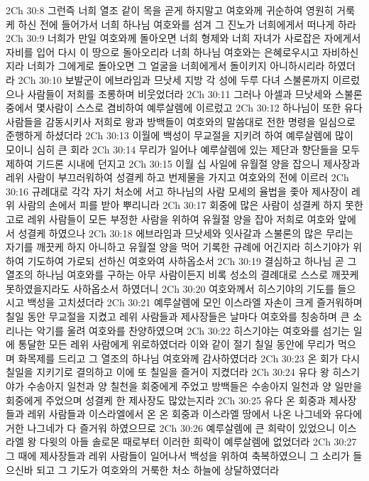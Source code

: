 2Ch 30:8  그런즉 너희 열조 같이 목을 곧게 하지말고 여호와께 귀순하여 영원히 거룩케 하신 전에 들어가서 너희 하나님 여호와를 섬겨 그 진노가 너희에게서 떠나게 하라
2Ch 30:9  너희가 만일 여호와께 돌아오면 너희 형제와 너희 자녀가 사로잡은 자에게서 자비를 입어 다시 이 땅으로 돌아오리라 너희 하나님 여호와는 은혜로우시고 자비하신지라 너희가 그에게로 돌아오면 그 얼굴을 너희에게서 돌이키지 아니하시리라 하였더라
2Ch 30:10  보발군이 에브라임과 므낫세 지방 각 성에 두루 다녀 스불론까지 이르렀으나 사람들이 저희를 조롱하며 비웃었더라
2Ch 30:11  그러나 아셀과 므낫세와 스불론 중에서 몇사람이 스스로 겸비하여 예루살렘에 이르렀고
2Ch 30:12  하나님이 또한 유다 사람들을 감동시키사 저희로 왕과 방백들이 여호와의 말씀대로 전한 명령을 일심으로 준행하게 하셨더라
2Ch 30:13  이월에 백성이 무교절을 지키려 하여 예루살렘에 많이 모이니 심히 큰 회라
2Ch 30:14  무리가 일어나 예루살렘에 있는 제단과 향단들을 모두 제하여 기드론 시내에 던지고
2Ch 30:15  이월 십 사일에 유월절 양을 잡으니 제사장과 레위 사람이 부끄러워하여 성결케 하고 번제물을 가지고 여호와의 전에 이르러
2Ch 30:16  규례대로 각각 자기 처소에 서고 하나님의 사람 모세의 율법을 좇아 제사장이 레위 사람의 손에서 피를 받아 뿌리니라
2Ch 30:17  회중에 많은 사람이 성결케 하지 못한고로 레위 사람들이 모든 부정한 사람을 위하여 유월절 양을 잡아 저희로 여호와 앞에서 성결케 하였으나
2Ch 30:18  에브라임과 므낫세와 잇사갈과 스불론의 많은 무리는 자기를 깨끗케 하지 아니하고 유월절 양을 먹어 기록한 규례에 어긴지라 히스기야가 위하여 기도하여 가로되 선하신 여호와여 사하옵소서
2Ch 30:19  결심하고 하나님 곧 그 열조의 하나님 여호와를 구하는 아무 사람이든지 비록 성소의 결례대로 스스로 깨끗케 못하였을지라도 사하옵소서 하였더니
2Ch 30:20  여호와께서 히스기야의 기도를 들으시고 백성을 고치셨더라
2Ch 30:21  예루살렘에 모인 이스라엘 자손이 크게 즐거워하며 칠일 동안 무교절을 지켰고 레위 사람들과 제사장들은 날마다 여호와를 칭송하며 큰 소리나는 악기를 울려 여호와를 찬양하였으며
2Ch 30:22  히스기야는 여호와를 섬기는 일에 통달한 모든 레위 사람에게 위로하였더라 이와 같이 절기 칠일 동안에 무리가 먹으며 화목제를 드리고 그 열조의 하나님 여호와께 감사하였더라
2Ch 30:23  온 회가 다시 칠일을 지키기로 결의하고 이에 또 칠일을 즐거이 지켰더라
2Ch 30:24  유다 왕 히스기야가 수송아지 일천과 양 칠천을 회중에게 주었고 방백들은 수송아지 일천과 양 일만을 회중에게 주었으며 성결케 한 제사장도 많았는지라
2Ch 30:25  유다 온 회중과 제사장들과 레위 사람들과 이스라엘에서 온 온 회중과 이스라엘 땅에서 나온 나그네와 유다에 거한 나그네가 다 즐거워 하였으므로
2Ch 30:26  예루살렘에 큰 희락이 있었으니 이스라엘 왕 다윗의 아들 솔로몬 때로부터 이러한 희락이 예루살렘에 없었더라
2Ch 30:27  그 때에 제사장들과 레위 사람들이 일어나서 백성을 위하여 축복하였으니 그 소리가 들으신바 되고 그 기도가 여호와의 거룩한 처소 하늘에 상달하였더라
